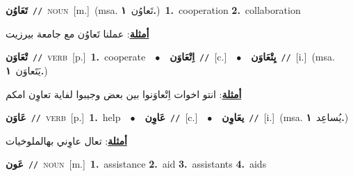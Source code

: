 \documentclass[10pt,a4paper,twoside]{article} %
\begin{document}
\begin{multicols}{2}
{\setlength\topsep{0pt}\textbf{\foreignlanguage{arabic}{تَعَاوُن}}\ {\color{gray}\texttt{//}\color{black}}\ \textsc{noun}\ [m.]\ \color{gray}(msa. \foreignlanguage{arabic}{تَعاوُن}~\foreignlanguage{arabic}{\textbf{١.}})\color{black}\ \textbf{1.}~cooperation  \textbf{2.}~collaboration\  \begin{flushright}\color{gray}\foreignlanguage{arabic}{\textbf{\underline{\foreignlanguage{arabic}{أمثلة}}}: عملنا تَعاوُن مع جامعة بيرزيت}\end{flushright}\color{black}} \vspace{2mm}

{\setlength\topsep{0pt}\textbf{\foreignlanguage{arabic}{تْعَاوَن}}\ {\color{gray}\texttt{//}\color{black}}\ \textsc{verb}\ [p.]\ \textbf{1.}~cooperate\ \ $\bullet$\ \ \setlength\topsep{0pt}\textbf{\foreignlanguage{arabic}{اِتْعَاوَن}}\ {\color{gray}\texttt{//}\color{black}}\ [c.]\ \ $\bullet$\ \ \setlength\topsep{0pt}\textbf{\foreignlanguage{arabic}{يِتْعَاوَن}}\ {\color{gray}\texttt{//}\color{black}}\ [i.]\ \color{gray}(msa. \foreignlanguage{arabic}{يَتَعاوَن}~\foreignlanguage{arabic}{\textbf{١.}})\color{black}\  \begin{flushright}\color{gray}\foreignlanguage{arabic}{\textbf{\underline{\foreignlanguage{arabic}{أمثلة}}}: انتو اخوات اِتْعاوَنوا بين بعض وجيبوا لفاية تعاوِن امكم}\end{flushright}\color{black}} \vspace{2mm}

{\setlength\topsep{0pt}\textbf{\foreignlanguage{arabic}{عَاوَن}}\ {\color{gray}\texttt{//}\color{black}}\ \textsc{verb}\ [p.]\ \textbf{1.}~help\ \ $\bullet$\ \ \setlength\topsep{0pt}\textbf{\foreignlanguage{arabic}{عَاوِن}}\ {\color{gray}\texttt{//}\color{black}}\ [c.]\ \ $\bullet$\ \ \setlength\topsep{0pt}\textbf{\foreignlanguage{arabic}{يعَاوِن}}\ {\color{gray}\texttt{//}\color{black}}\ [i.]\ \color{gray}(msa. \foreignlanguage{arabic}{يُساعِد}~\foreignlanguage{arabic}{\textbf{١.}})\color{black}\  \begin{flushright}\color{gray}\foreignlanguage{arabic}{\textbf{\underline{\foreignlanguage{arabic}{أمثلة}}}: تعال عاوِني بهالملوخيات}\end{flushright}\color{black}} \vspace{2mm}

{\setlength\topsep{0pt}\textbf{\foreignlanguage{arabic}{عَون}}\ {\color{gray}\texttt{//}\color{black}}\ \textsc{noun}\ [m.]\ \textbf{1.}~assistance  \textbf{2.}~aid  \textbf{3.}~assistants  \textbf{4.}~aids\ } \vspace{2mm}


\end{multicols}
\end{document}
